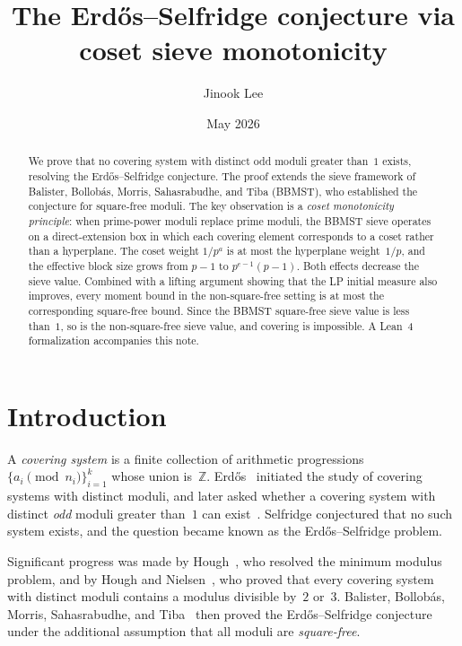 \documentclass[11pt]{amsart}
\title{The Erd\H{o}s--Selfridge conjecture via coset sieve monotonicity}
\author{Jinook Lee}
\date{May 2026}
\theoremstyle{definition}
\theoremstyle{remark}
\begin{document}
\begin{abstract}
We prove that no covering system with distinct odd moduli greater than~$1$ exists,
resolving the Erd\H{o}s--Selfridge conjecture.
The proof extends the sieve framework of Balister, Bollob\'as, Morris, Sahasrabudhe,
and Tiba (BBMST), who established the conjecture for square-free moduli.
The key observation is a \emph{coset monotonicity principle}:
when prime-power moduli replace prime moduli, the BBMST sieve operates on a
direct-extension box in which each covering element corresponds to a coset
rather than a hyperplane. The coset weight $1/p^a$ is at most the hyperplane
weight~$1/p$, and the effective block size grows from $p - 1$ to
$p^{e-1}(p - 1)$. Both effects decrease the sieve value.
Combined with a lifting argument showing that the LP initial measure also
improves, every moment bound in the non-square-free setting is at most
the corresponding square-free bound. Since the BBMST square-free sieve value
is less than~$1$, so is the non-square-free sieve value, and covering is
impossible.
A Lean~4 formalization accompanies this note.
\end{abstract}

\maketitle

\section{Introduction}

A \emph{covering system} is a finite collection of arithmetic progressions
$\{a_i \pmod{n_i}\}_{i=1}^{k}$ whose union is~$\mathbb{Z}$.
Erd\H{o}s~\cite{Erdos1950} initiated the study of covering systems with distinct moduli,
and later asked whether a covering system with distinct \emph{odd} moduli greater than~$1$
can exist~\cite{Erdos1965}.
Selfridge conjectured that no such system exists, and the question became known as the
Erd\H{o}s--Selfridge problem.

Significant progress was made by Hough~\cite{Hough2015}, who resolved the minimum modulus
problem, and by Hough and Nielsen~\cite{HoughNielsen2019}, who proved that every covering
system with distinct moduli contains a modulus divisible by~$2$ or~$3$.
Balister, Bollob\'as, Morris, Sahasrabudhe, and Tiba~\cite{BBMST2019} then proved the
Erd\H{o}s--Selfridge conjecture under the additional assumption that all moduli are
\emph{square-free}.
\end{document}
